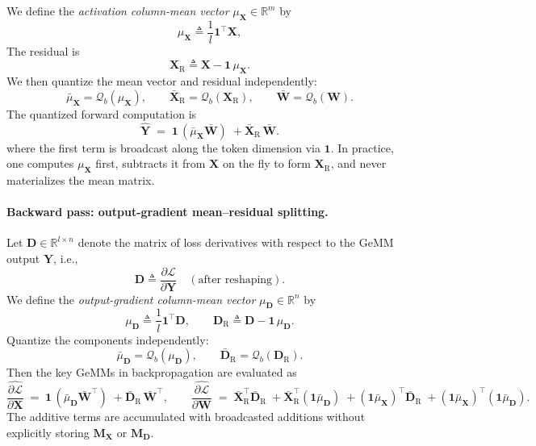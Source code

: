 We define the \emph{activation column-mean vector} $\mu_{\mathbf{X}}\in\mathbb{R}^{m}$ by
\[
\mu_{\mathbf{X}} \triangleq \frac{1}{l}\mathbf{1}^{\top}\mathbf{X},
\]
The residual is
\[
\mathbf{X}_{\mathrm{R}} \triangleq \mathbf{X}-\mathbf{1}\,\mu_{\mathbf{X}}.
\]
We then quantize the mean vector and residual independently:
\[
\bar{\mu}_{\mathbf{X}}=\mathcal{Q}_b(\mu_{\mathbf{X}}),
\qquad
\bar{\mathbf{X}}_{\mathrm{R}}=\mathcal{Q}_b(\mathbf{X}_{\mathrm{R}}),
\qquad
\bar{\mathbf{W}}=\mathcal{Q}_b(\mathbf{W}).
\]
The quantized forward computation is
\begin{equation}
\label{eq:averis_forward}
\hat{\mathbf{Y}}
\;=\;
\mathbf{1}\,(\bar{\mu}_{\mathbf{X}}\bar{\mathbf{W}})
\;+
\bar{\mathbf{X}}_{\mathrm{R}}\,\bar{\mathbf{W}}.
\end{equation}
where the first term is broadcast along the token dimension via $\mathbf{1}$.
In practice, one computes $\mu_{\mathbf{X}}$ first, subtracts it from $\mathbf{X}$ on the fly to form
$\mathbf{X}_{\mathrm{R}}$, and never materializes the mean matrix.

\paragraph{Backward pass: output-gradient mean--residual splitting.}
Let $\mathbf{D}\in\mathbb{R}^{l\times n}$ denote the matrix of loss derivatives with respect to
the GeMM output $\mathbf{Y}$, i.e.,
\[
\mathbf{D}\triangleq \frac{\partial \mathcal{L}}{\partial \mathbf{Y}}
\quad (\text{after reshaping}).
\]
We define the \emph{output-gradient column-mean vector} $\mu_{\mathbf{D}}\in\mathbb{R}^{n}$ by
\[
\mu_{\mathbf{D}} \triangleq \frac{1}{l}\mathbf{1}^{\top}\mathbf{D},
\qquad
\mathbf{D}_{\mathrm{R}} \triangleq \mathbf{D}-\mathbf{1}\,\mu_{\mathbf{D}}.
\]
Quantize the components independently:
\[
\bar{\mu}_{\mathbf{D}}=\mathcal{Q}_b(\mu_{\mathbf{D}}),
\qquad
\bar{\mathbf{D}}_{\mathrm{R}}=\mathcal{Q}_b(\mathbf{D}_{\mathrm{R}}).
\]
Then the key GeMMs in backpropagation are evaluated as
\begin{equation}
\label{eq:averis_backward}
\widehat{\frac{\partial \mathcal{L}}{\partial \mathbf{X}}}
\;=\;
\mathbf{1}\,(\bar{\mu}_{\mathbf{D}}\bar{\mathbf{W}}^{\top})
\;+
\bar{\mathbf{D}}_{\mathrm{R}}\,\bar{\mathbf{W}}^{\top},
\qquad
\widehat{\frac{\partial \mathcal{L}}{\partial \mathbf{W}}}
\;=\;
\bar{\mathbf{X}}_{\mathrm{R}}^{\top}\bar{\mathbf{D}}_{\mathrm{R}}
\;+
\bar{\mathbf{X}}_{\mathrm{R}}^{\top}(\mathbf{1}\bar{\mu}_{\mathbf{D}})
\;+
(\mathbf{1}\bar{\mu}_{\mathbf{X}})^{\top}\bar{\mathbf{D}}_{\mathrm{R}}
\;+
(\mathbf{1}\bar{\mu}_{\mathbf{X}})^{\top}(\mathbf{1}\bar{\mu}_{\mathbf{D}}).
\end{equation}
The additive terms are accumulated with broadcasted additions without explicitly storing
$\mathbf{M}_{\mathbf{X}}$ or $\mathbf{M}_{\mathbf{D}}$.

